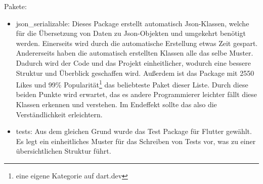 \myNewSection
Pakete:
\begin{itemize}
	
	\item json\_serializable\cite{tech_packageJson}: %
		Dieses Package erstellt automatisch Json-Klassen, welche für die Übersetzung von Daten zu Json-Objekten und umgekehrt benötigt werden. %
		Einerseits wird durch die automatische Erstellung etwas Zeit gespart. %
		Andererseits haben die automatisch erstellten Klassen alle das selbe Muster. Dadurch wird der Code und das Projekt einheitlicher, wodurch eine bessere Struktur und Überblick geschaffen wird. %
		Außerdem ist das Package mit 2550 Likes und 99\% Popularität\footnote{eine eigene Kategorie auf dart.dev} das beliebteste Paket dieser Liste. %
		Durch diese beiden Punkte wird erwartet, das es andere Programmierer leichter fällt diese Klassen erkennen und verstehen. Im Endeffekt sollte das also die Verständlichkeit erleichtern.%
		 

	\item tests\cite{tech_packageTest}: %
		Aus dem gleichen Grund wurde das Test Package für Flutter gewählt. Es legt ein einheitliches Muster für das Schreiben von Tests vor, was zu einer übersichtlichen Struktur führt. %
		

\end{itemize}
